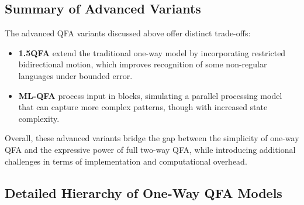 \subsection*{Summary of Advanced Variants}
The advanced QFA variants discussed above offer distinct trade-offs:
\begin{itemize}
    \item \textbf{1.5QFA} extend the traditional one-way model by incorporating restricted bidirectional motion, which improves recognition of some non-regular languages under bounded error.
    \item \textbf{ML-QFA} process input in blocks, simulating a parallel processing model that can capture more complex patterns, though with increased state complexity.
\end{itemize}
Overall, these advanced variants bridge the gap between the simplicity of one-way QFA and the expressive power of full two-way QFA, while introducing additional challenges in terms of implementation and computational overhead.


\subsection*{Detailed Hierarchy of One-Way QFA Models}
\label{subsec:hierarchy-diagram}

